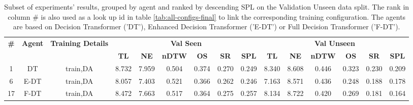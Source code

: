 \begin{table}
\centering
\caption{\label{tab:dagger}Subset of experiments' results, grouped by agent and ranked by descending SPL on the Validation Unseen data split. The rank in column \# is also used as a look up id in table \ref{tab:all-configs-final} to link the corresponding training configuration.     \newline The agents are based on Decision Transformer ('DT'), Enhanced Decision Transformer ('E-DT') or Full Decision Transformer ('F-DT').}
\begin{tabular}{@{\hskip3pt}c@{\hskip3pt}c@{\hskip3pt}c@{\hskip3pt}c@{\hskip3pt}c@{\hskip3pt}c@{\hskip3pt}c@{\hskip3pt}c@{\hskip3pt}c@{\hskip3pt}c@{\hskip3pt}c@{\hskip3pt}c@{\hskip3pt}c@{\hskip3pt}c@{\hskip3pt}c}
\toprule
\textbf{\#} & \textbf{Agent} & \textbf{Training Details} & \multicolumn{6}{c}{\textbf{Val Seen}} & \multicolumn{6}{c}{\textbf{Val Unseen}} \\
\cmidrule(l){4-9} \cmidrule(l){10-15} \textbf{~} &     \textbf{~} &                \textbf{~} &       \textbf{TL} & \textbf{NE} & \textbf{nDTW} & \textbf{OS} & \textbf{SR} & \textbf{SPL} &         \textbf{TL} & \textbf{NE} & \textbf{nDTW} & \textbf{OS} & \textbf{SR} & \textbf{SPL} \\
\midrule
          1 &             DT &                  train,DA &             8.732 &       7.959 &         0.504 &       0.374 &       0.270 &        0.249 &               8.340 &       8.608 &         0.446 &       0.323 &       0.230 &        0.209 \\
          6 &           E-DT &                  train,DA &             8.057 &       7.403 &         0.521 &       0.366 &       0.262 &        0.246 &               7.163 &       8.571 &         0.436 &       0.248 &       0.188 &        0.178 \\
         17 &           F-DT &                  train,DA &             8.472 &       7.663 &         0.517 &       0.364 &       0.275 &        0.257 &               8.134 &       8.722 &         0.420 &       0.269 &       0.181 &        0.164 \\
\bottomrule
\end{tabular}
\end{table}
